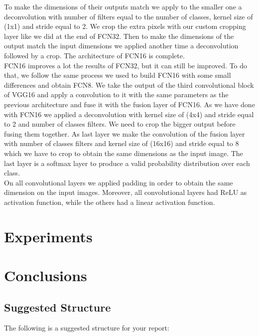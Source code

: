\documentclass[10pt,twocolumn,letterpaper]{article}
\begin{document}
To make the dimensions of their outputs match we apply to the smaller one a deconvolution with number of filters equal to the number of classes, kernel size of (1x1) and stride equal to 2. We crop the extra pixels with our custom cropping layer like we did at the end of FCN32. Then to make the dimensions of the output match the input dimensions we applied another time a deconvolution followed by a crop. The architecture of FCN16 is complete. \\
FCN16 improves a lot the results of FCN32, but it can still be improved. To do that, we follow the same process we used to build FCN16 with some small differences and obtain FCN8.
We take the output of the third convolutional block of VGG16 and apply a convolution to it with the same parameters as the previous architecture and fuse it with the fusion layer of FCN16. As we have done with FCN16 we applied a deconvolution with kernel size of (4x4) and stride equal to 2 and number of classes filters. We need to crop the bigger output before fusing them together. As last layer we make the convolution of the fusion layer with number of classes filters and kernel size of (16x16) and stride equal to 8 which we have to crop to obtain the same dimensions as the input image. The last layer is a softmax layer to produce a valid probability distribution over each class. \\
On all convolutional layers we applied padding in order to obtain the same dimension on the input images. Moreover, all convolutional layers had ReLU as activation function, while the others had a linear activation function.  


\section{Experiments}

\section{Conclusions}

\subsection{Suggested Structure}

The following is a suggested structure for your report:
\end{document}
